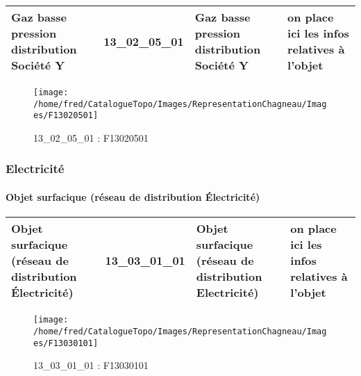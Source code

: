 \documentclass[12pt,titlepage,oneside]{book}
\begin{document}
\renewcommand{\arraystretch}{1.2}
\begin{supertabular}{|p{10cm}|c|p{13cm}|p{12cm}|}
 Gaz basse pression distribution Société Y & 13\_02\_05\_01 & Gaz basse pression distribution Société Y & on place ici les infos relatives à l'objet\\
\hline
\end{supertabular}
\begin{figure}[h!]
  \hfill         %
  \begin{minipage}[t]{3cm}
    \begin{center}
      \texttt{[image: /home/fred/CatalogueTopo/Images/RepresentationChagneau/Images/F13020501]}
      \caption[F13020501]{\label{} 13\_02\_05\_01 : F13020501}
    \end{center}
  \end{minipage}
\end{figure}

\subsubsection{\large Electricité}
\paragraph{Objet surfacique (réseau de distribution Électricité)}
\noindent
\vspace{\baselineskip}

\renewcommand{\arraystretch}{1.2}
\begin{supertabular}{|p{10cm}|c|p{13cm}|p{12cm}|}
 Objet surfacique (réseau de distribution Électricité) & 13\_03\_01\_01 & Objet surfacique (réseau de distribution Electricité) & on place ici les infos relatives à l'objet\\
\hline
\end{supertabular}
\begin{figure}[h!]
  \hfill         %
  \begin{minipage}[t]{3cm}
    \begin{center}
      \texttt{[image: /home/fred/CatalogueTopo/Images/RepresentationChagneau/Images/F13030101]}
      \caption[F13030101]{\label{} 13\_03\_01\_01 : F13030101}
    \end{center}
  \end{minipage}
\end{figure}
\end{document}
